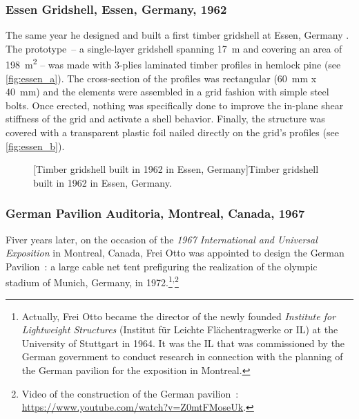 \subsubsection{Essen Gridshell, Essen, Germany, 1962}
The same year he designed and built a first timber gridshell at Essen, Germany \cite[p.~272]{IL10}. The prototype~-- a single-layer gridshell spanning \SI{17}{m} and covering an area of \SI{198}{m^2} -- was made with 3-plies laminated timber profiles in hemlock pine (see \cref{fig:essen_a}). The cross-section of the profiles was rectangular (\SI{60}{mm} x \SI{40}{mm}) and the elements were assembled in a grid fashion with simple steel bolts. Once erected, nothing was specifically done to improve the in-plane shear stiffness of the grid and activate a shell behavior. Finally, the structure was covered with a transparent plastic foil nailed directly on the grid's profiles (see \cref{fig:essen_b}).
\begin{figure}[t]
		\hspace*{\fill}
		\vspace{10pt}
		[Timber gridshell built in 1962 in Essen, Germany]{Timber gridshell built in 1962 in Essen, Germany.}
		\label{fig:essen}    
\end{figure}

\subsubsection{German Pavilion Auditoria, Montreal, Canada, 1967}
Fiver years later, on the occasion of the \emph{1967 International and Universal Exposition} in Montreal, Canada, Frei Otto was appointed to design the German Pavilion~: a large cable net tent prefiguring the realization of the olympic stadium of Munich, Germany, in 1972.\footnote{Actually, Frei Otto became the director of the newly founded \emph{Institute for Lightweight Structures} (Institut für Leichte Flächentragwerke or IL) at the University of Stuttgart in 1964. It was the IL that was commissioned by the German government to conduct research in connection with the planning of the German pavilion for the exposition in Montreal.}\textsuperscript{,}\footnote{Video of the construction of the German pavilion~: \url{https://www.youtube.com/watch?v=Z0mtFMoseUk}.} 

